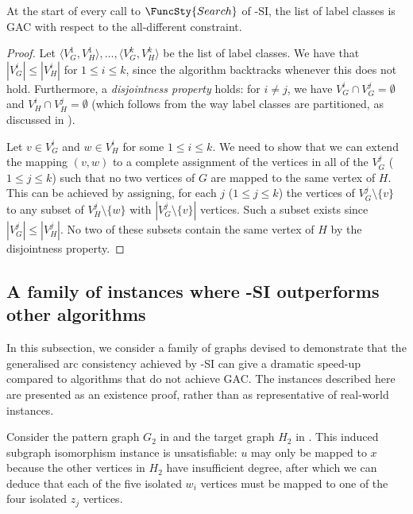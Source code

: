 \begin{proposition}\label{gacProposition}
    At the start of every call to $\FuncSty{Search}$ of
    \McSplit-SI, the list of label classes is GAC with respect to 
    the all-different constraint.
\end{proposition}

\begin{proof}
Let $\langle V_G^1, V_H^1 \rangle, \dots, \langle V_G^k, V_H^k \rangle$ be the list of
label classes.  
We have that $|V_G^i| \leq |V_H^i|$ for $1 \leq i \leq k$, since the algorithm
backtracks whenever this does not hold.
Furthermore, a \emph{disjointness property} holds: for $i \not= j$, we have
    $V_G^i \cap V_G^j = \emptyset$ and $V_H^i \cap V_H^j =
    \emptyset$ (which follows from the way label classes are partitioned,
    as discussed in ).

Let $v \in V_G^i$ and $w \in V_H^i$ for some $1 \leq i \leq k$.  We need to show that we
can extend the mapping
$(v,w)$ to a complete assignment of the vertices in all of the $V_G^j$ ($1 \leq j \leq k$)
such that no two vertices of $G$ are mapped to the same vertex of $H$.
This can be achieved by assigning, for each $j$ ($1 \leq j \leq k$) the vertices of
$V_G^j \setminus \{v\}$ to any subset of
$V_H^j \setminus \{w\}$ with $|V_G^j \setminus \{v\}|$ vertices.
Such a subset exists since $|V_G^j| \leq |V_H^j|$. No two of these subsets
contain the same vertex of $H$ by the disjointness property.
\end{proof}

\subsection{A family of instances where \McSplit-SI outperforms other algorithms}

In this subsection, we consider a family of graphs devised to demonstrate
that the generalised arc consistency achieved by \McSplit-SI can give a dramatic
speed-up compared to algorithms that do not achieve GAC.
The instances described here are presented as an existence proof, rather than
as representative of real-world instances.

Consider the pattern graph $G_2$ in  and the target
graph $H_2$ in .  This induced subgraph isomorphism
instance is unsatisfiable: $u$ may only be mapped to $x$ because the other
vertices in $H_2$ have insufficient degree, after which we can deduce
that each of the five isolated $w_i$ vertices must be mapped to one of the four
isolated $z_j$ vertices.

